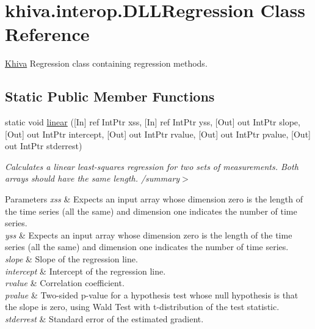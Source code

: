 \hypertarget{classkhiva_1_1interop_1_1_d_l_l_regression}{}\section{khiva.\+interop.\+D\+L\+L\+Regression Class Reference}
\label{classkhiva_1_1interop_1_1_d_l_l_regression}


\mbox{\hyperlink{classkhiva_1_1_khiva}{Khiva}} Regression class containing regression methods.  


\subsection*{Static Public Member Functions}
\begin{DoxyCompactItemize}
\item 
static void \mbox{\hyperlink{classkhiva_1_1interop_1_1_d_l_l_regression_ad3c7e4dbe514d3a447af192b983e77a7}{linear}} (\mbox{[}In\mbox{]} ref Int\+Ptr xss, \mbox{[}In\mbox{]} ref Int\+Ptr yss, \mbox{[}Out\mbox{]} out Int\+Ptr slope, \mbox{[}Out\mbox{]} out Int\+Ptr intercept, \mbox{[}Out\mbox{]} out Int\+Ptr rvalue, \mbox{[}Out\mbox{]} out Int\+Ptr pvalue, \mbox{[}Out\mbox{]} out Int\+Ptr stderrest)
\begin{DoxyCompactList}\small\item\em Calculates a linear least-\/squares regression for two sets of measurements. Both arrays should have the same length. /summary$>$ 
\begin{DoxyParams}{Parameters}
{\em xss} & Expects an input array whose dimension zero is the length of the time series (all the same) and dimension one indicates the number of time series.\\
\hline
{\em yss} & Expects an input array whose dimension zero is the length of the time series (all the same) and dimension one indicates the number of time series.\\
\hline
{\em slope} & Slope of the regression line.\\
\hline
{\em intercept} & Intercept of the regression line.\\
\hline
{\em rvalue} & Correlation coefficient.\\
\hline
{\em pvalue} & Two-\/sided p-\/value for a hypothesis test whose null hypothesis is that the slope is zero, using Wald Test with t-\/distribution of the test statistic.\\
\hline
{\em stderrest} & Standard error of the estimated gradient.\\
\hline
\end{DoxyParams}
\end{DoxyCompactList}\end{DoxyCompactItemize}


